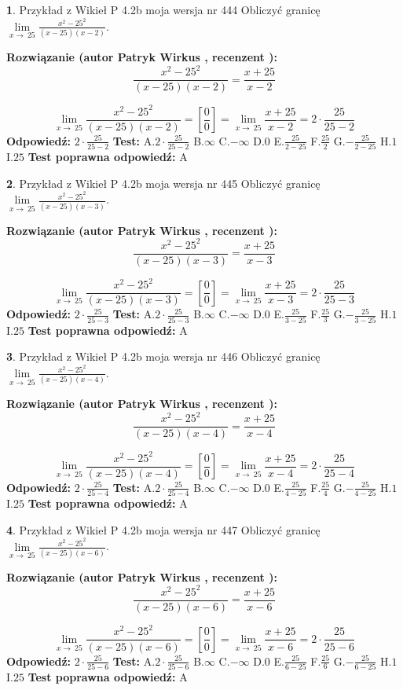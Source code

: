 \documentclass[12pt, a4paper]{article}
\theoremstyle{definition} %
\newtheorem{zad}{}
\newcommand{\zadStart}[1]{\begin{zad}#1\newline}
\newcommand{\zadStop}{\end{zad}}
\newcommand{\rozwStart}[2]{\noindent \textbf{Rozwiązanie (autor #1 , recenzent #2): }\newline}
\newcommand{\rozwStop}{\newline}
\newcommand{\odpStart}{\noindent \textbf{Odpowiedź:}\newline}
\newcommand{\odpStop}{\newline}
\newcommand{\testStart}{\noindent \textbf{Test:}\newline}
\newcommand{\testStop}{\newline}
\newcommand{\kluczStart}{\noindent \textbf{Test poprawna odpowiedź:}\newline}
\newcommand{\kluczStop}{\newline}
\begin{document}
\zadStart{Przykład z Wikieł P 4.2b moja wersja nr 444}
Obliczyć granicę $\lim\limits_{x\to\ 25}\frac{x^{2}-25^{2}}{(x-25)(x-2)}$.
\zadStop
\rozwStart{Patryk Wirkus}{}
$$\frac{x^{2}-25^{2}}{(x-25)(x-2)}=\frac{x+25}{x-2}$$

$$\lim\limits_{x\to\ 25}\frac{x^{2}-25^{2}}{(x-25)(x-2)}=[\frac{0}{0}]=\lim\limits_{x\to\ 25}\frac{x+25}{x-2}=2 \cdot \frac{25}{25-2}$$
\rozwStop
\odpStart
$2 \cdot \frac{25}{25-2}$
\odpStop
\testStart
A.$2 \cdot \frac{25}{25-2}$
B.$\infty$
C.$-\infty$
D.$0$
E.$\frac{25}{2-25}$
F.$\frac{25}{2}$
G.$-\frac{25}{2-25}$
H.$1$
I.$25$
\testStop
\kluczStart
A
\kluczStop



\zadStart{Przykład z Wikieł P 4.2b moja wersja nr 445}
Obliczyć granicę $\lim\limits_{x\to\ 25}\frac{x^{2}-25^{2}}{(x-25)(x-3)}$.
\zadStop
\rozwStart{Patryk Wirkus}{}
$$\frac{x^{2}-25^{2}}{(x-25)(x-3)}=\frac{x+25}{x-3}$$

$$\lim\limits_{x\to\ 25}\frac{x^{2}-25^{2}}{(x-25)(x-3)}=[\frac{0}{0}]=\lim\limits_{x\to\ 25}\frac{x+25}{x-3}=2 \cdot \frac{25}{25-3}$$
\rozwStop
\odpStart
$2 \cdot \frac{25}{25-3}$
\odpStop
\testStart
A.$2 \cdot \frac{25}{25-3}$
B.$\infty$
C.$-\infty$
D.$0$
E.$\frac{25}{3-25}$
F.$\frac{25}{3}$
G.$-\frac{25}{3-25}$
H.$1$
I.$25$
\testStop
\kluczStart
A
\kluczStop



\zadStart{Przykład z Wikieł P 4.2b moja wersja nr 446}
Obliczyć granicę $\lim\limits_{x\to\ 25}\frac{x^{2}-25^{2}}{(x-25)(x-4)}$.
\zadStop
\rozwStart{Patryk Wirkus}{}
$$\frac{x^{2}-25^{2}}{(x-25)(x-4)}=\frac{x+25}{x-4}$$

$$\lim\limits_{x\to\ 25}\frac{x^{2}-25^{2}}{(x-25)(x-4)}=[\frac{0}{0}]=\lim\limits_{x\to\ 25}\frac{x+25}{x-4}=2 \cdot \frac{25}{25-4}$$
\rozwStop
\odpStart
$2 \cdot \frac{25}{25-4}$
\odpStop
\testStart
A.$2 \cdot \frac{25}{25-4}$
B.$\infty$
C.$-\infty$
D.$0$
E.$\frac{25}{4-25}$
F.$\frac{25}{4}$
G.$-\frac{25}{4-25}$
H.$1$
I.$25$
\testStop
\kluczStart
A
\kluczStop



\zadStart{Przykład z Wikieł P 4.2b moja wersja nr 447}
Obliczyć granicę $\lim\limits_{x\to\ 25}\frac{x^{2}-25^{2}}{(x-25)(x-6)}$.
\zadStop
\rozwStart{Patryk Wirkus}{}
$$\frac{x^{2}-25^{2}}{(x-25)(x-6)}=\frac{x+25}{x-6}$$

$$\lim\limits_{x\to\ 25}\frac{x^{2}-25^{2}}{(x-25)(x-6)}=[\frac{0}{0}]=\lim\limits_{x\to\ 25}\frac{x+25}{x-6}=2 \cdot \frac{25}{25-6}$$
\rozwStop
\odpStart
$2 \cdot \frac{25}{25-6}$
\odpStop
\testStart
A.$2 \cdot \frac{25}{25-6}$
B.$\infty$
C.$-\infty$
D.$0$
E.$\frac{25}{6-25}$
F.$\frac{25}{6}$
G.$-\frac{25}{6-25}$
H.$1$
I.$25$
\testStop
\kluczStart
A
\kluczStop
\end{document}
